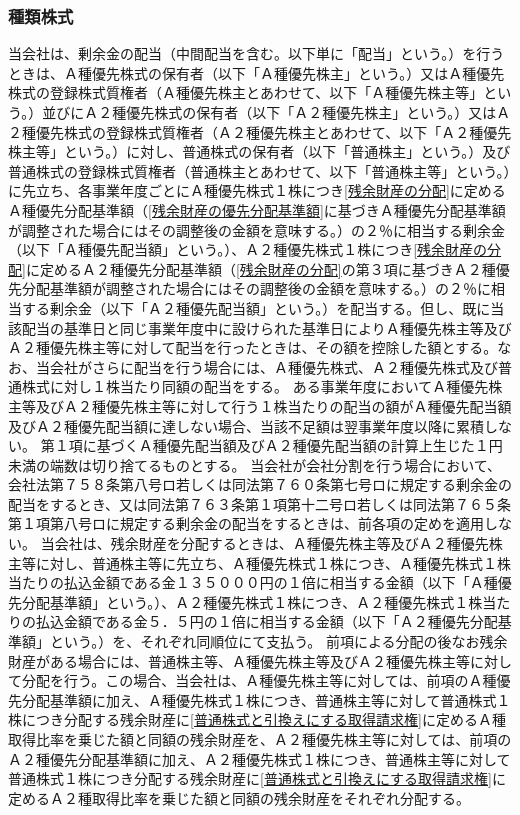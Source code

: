 \documentclass[10pt,a4paper,uplatex]{jsarticle}
\begin{document}
\subsubsection{種類株式}
当会社は、剰余金の配当（中間配当を含む。以下単に「配当」という。）を行うときは、Ａ種優先株式の保有者（以下「Ａ種優先株主」という。）又はＡ種優先株式の登録株式質権者（Ａ種優先株主とあわせて、以下「Ａ種優先株主等」という。）並びにＡ２種優先株式の保有者（以下「Ａ２種優先株主」という。）又はＡ２種優先株式の登録株式質権者（Ａ２種優先株主とあわせて、以下「Ａ２種優先株主等」という。）に対し、普通株式の保有者（以下「普通株主」という。）及び普通株式の登録株式質権者（普通株主とあわせて、以下「普通株主等」という。）に先立ち、各事業年度ごとにＡ種優先株式１株につき\ref{残余財産の分配}に定めるＡ種優先分配基準額（\ref{残余財産の優先分配基準額}に基づきＡ種優先分配基準額が調整された場合にはその調整後の金額を意味する。）の２％に相当する剰余金（以下「Ａ種優先配当額」という。）、Ａ２種優先株式１株につき\ref{残余財産の分配}に定めるＡ２種優先分配基準額（\ref{残余財産の分配}の第３項に基づきＡ２種優先分配基準額が調整された場合にはその調整後の金額を意味する。）の２％に相当する剰余金（以下「Ａ２種優先配当額」という。）を配当する。但し、既に当該配当の基準日と同じ事業年度中に設けられた基準日によりＡ種優先株主等及びＡ２種優先株主等に対して配当を行ったときは、その額を控除した額とする。なお、当会社がさらに配当を行う場合には、Ａ種優先株式、Ａ２種優先株式及び普通株式に対し１株当たり同額の配当をする。
\label{優先配当}
\term ある事業年度においてＡ種優先株主等及びＡ２種優先株主等に対して行う１株当たりの配当の額がＡ種優先配当額及びＡ２種優先配当額に達しない場合、当該不足額は翌事業年度以降に累積しない。
\term 第１項に基づくＡ種優先配当額及びＡ２種優先配当額の計算上生じた１円未満の端数は切り捨てるものとする。
\term 当会社が会社分割を行う場合において、会社法第７５８条第八号ロ若しくは同法第７６０条第七号ロに規定する剰余金の配当をするとき、又は同法第７６３条第１項第十二号ロ若しくは同法第７６５条第１項第八号ロに規定する剰余金の配当をするときは、前各項の定めを適用しない。
当会社は、残余財産を分配するときは、Ａ種優先株主等及びＡ２種優先株主等に対し、普通株主等に先立ち、Ａ種優先株式１株につき、Ａ種優先株式１株当たりの払込金額である金１３５０００円の１倍に相当する金額（以下「Ａ種優先分配基準額」という。）、Ａ２種優先株式１株につき、Ａ２種優先株式１株当たりの払込金額である金５．５円の１倍に相当する金額（以下「Ａ２種優先分配基準額」という。）を、それぞれ同順位にて支払う。
\label{残余財産の分配}
\term 前項による分配の後なお残余財産がある場合には、普通株主等、Ａ種優先株主等及びＡ２種優先株主等に対して分配を行う。この場合、当会社は、Ａ種優先株主等に対しては、前項のＡ種優先分配基準額に加え、Ａ種優先株式１株につき、普通株主等に対して普通株式１株につき分配する残余財産に\ref{普通株式と引換えにする取得請求権}に定めるＡ種取得比率を乗じた額と同額の残余財産を、Ａ２種優先株主等に対しては、前項のＡ２種優先分配基準額に加え、Ａ２種優先株式１株につき、普通株主等に対して普通株式１株につき分配する残余財産に\ref{普通株式と引換えにする取得請求権}に定めるＡ２種取得比率を乗じた額と同額の残余財産をそれぞれ分配する。
\end{document}
